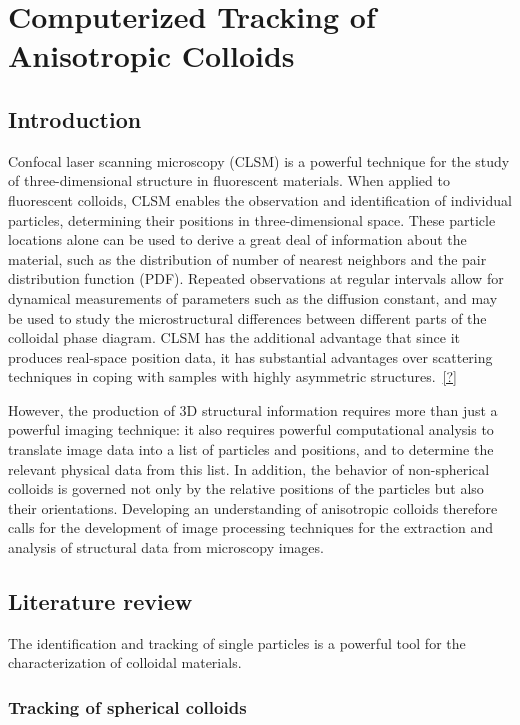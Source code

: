 \chapter{Computerized Tracking of Anisotropic Colloids}
\label{ch:comp-tracking}

\section{Introduction}

Confocal laser scanning microscopy (CLSM) is a powerful technique for the study of three-dimensional
structure in fluorescent materials. When applied to fluorescent colloids, CLSM enables the observation
and identification of individual particles, determining their positions in three-dimensional space.
These particle locations alone can be used to derive a great deal
of information about the material, such as the distribution of number of nearest neighbors and
the pair distribution function (PDF). Repeated observations at regular intervals allow for dynamical
measurements of parameters such as the diffusion constant, and may be used to study the microstructural
differences between different parts of the colloidal phase diagram. CLSM has the additional advantage
that since it produces real-space position data, it has substantial advantages over scattering techniques
in coping with samples with highly asymmetric structures.~\ref{?}

However, 
the production of 3D structural information requires more than just a powerful imaging technique: it also
requires powerful computational analysis to translate image data into a list of particles and positions, and
to determine the relevant physical data from this list.  In addition, the behavior of non-spherical colloids
is governed not only by the relative positions of the particles but also their orientations. Developing an
understanding of anisotropic colloids
therefore calls for the development of image processing techniques for the extraction and analysis of
structural data from microscopy images.

\section{Literature review}

The identification and tracking of single particles is a powerful tool for the characterization 
of colloidal materials.  

\subsection{Tracking of spherical colloids}

